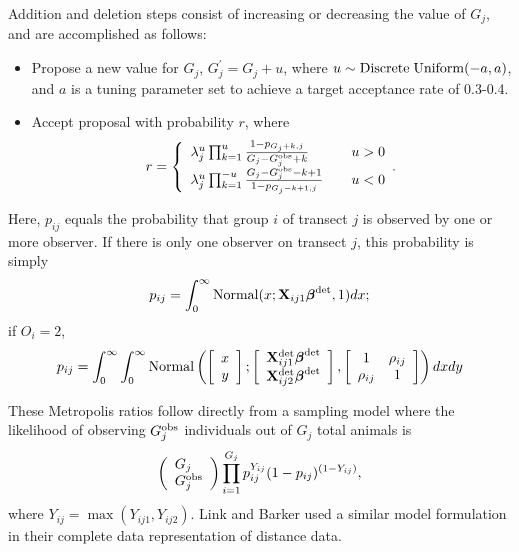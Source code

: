 \documentclass[10pt]{article}
\begin{document}
Addition and deletion steps consist of increasing or decreasing the value of $G_j$, and are accomplished as follows:
\begin{itemize}
    \item Propose a new value for $G_j$, $G_j^\prime=G_j+u$, where
    $u\sim {\rm Discrete \hspace{1mm} Uniform}(-a,a)$, and $a$ is a tuning parameter set to achieve a target acceptance rate of 0.3-0.4.
    \item Accept proposal with probability $r$, where
    $$
    r= \left\{ \begin{array}{lll}
				\lambda_j^u \prod_{k=1}^u
                \frac{1-p_{G_j+k,j}}{G_j-G_j^{\rm obs}+k}& & u>0\\
			    \lambda_j^u \prod_{k=1}^{-u}
                \frac{G_j-G_j^{\rm obs}-k+1}{
                1-p_{G_j-k+1,j}}& & u<0
		\end{array}. \right.
    $$
\end{itemize}
    Here, $p_{ij}$ equals the probability that group $i$ of transect $j$ is observed by one or more observer.  If there is only one observer on transect $j$, this probability is simply $$
      p_{ij} = \int_0^\infty {\rm Normal}(x;{\bf X}_{ij1}\boldsymbol{\beta}^{\rm det},1)dx;
    $$
    if $O_i=2$,
    $$
      p_{ij} = \int_0^\infty \int_0^\infty {\rm Normal}
        \left( \left[ \begin{array}{c}
				x\\
				y
		\end{array} \right]; \left[
        \begin{array}{c}
				{\bf X}_{ij1}^{\rm det} \boldsymbol{\beta}^{\rm
                det}\\
				{\bf X}_{ij2}^{\rm det} \boldsymbol{\beta}^{\rm
                det}
		\end{array}\right],
        \left[ \begin{array}{cc}
            1 & \rho_{ij} \\
            \rho_{ij} & 1
        \end{array} \right]
        \right) dx dy
    $$

These Metropolis ratios follow directly from a sampling model where the likelihood of observing $G_j^{\rm obs}$ individuals out of $G_j$ total animals is
$$
\left( \begin{array}{l}
G_j \\
G_j^{\rm obs}
\end{array} \right)
\prod_{i=1}^{G_j} p_{ij}^{Y_{ij}} (1-p_{ij})^{(1-Y_{ij})},
$$
where $Y_{ij}=\max(Y_{ij1},Y_{ij2})$.  Link and Barker \cite{LinkBarker2010} used a similar model formulation in their complete data representation of distance data.
\end{document}
